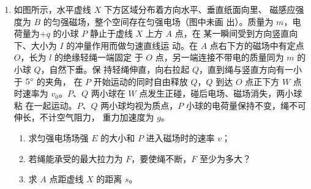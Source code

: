\begin{enumerate}
\item 
{}
如图所示，水平虚线 $ X $ 下方区域分布着方向水平、垂直纸面向里、
磁感应强度为 $ B $ 的匀强磁场，整个空间存在匀强电场（图中未画
出）。质量为 $ m $，电荷量为$ +q $ 的小球 $ P $ 静止于虚线 $ X $ 上方 $ A $ 点，在
某一瞬间受到方向竖直向下、大小为 $ I $ 的冲量作用而做匀速直线运
动。在 $ A $ 点右下方的磁场中有定点 $ O $，长为 $ l $ 的绝缘轻绳一端固定
于 $ O $ 点，另一端连接不带电的质量同为 $ m $ 的小球 $ Q $，自然下垂。保
持轻绳伸直，向右拉起 $ Q $，直到绳与竖直方向有一小于 $ 5 \degree  $ 的夹角，
在 $ P $ 开始运动的同时自由释放 $ Q $，$ Q $ 到达 $ O $ 点正下方 $ W $ 点时速率为
$ v_{0} $。$ P $、$ Q $ 两小球在 $ W $ 点发生正碰，碰后电场、磁场消失，两小球粘
在一起运动。$ P $、$ Q $ 两小球均视为质点，$ P $ 小球的电荷量保持不变，绳不可伸长，不计空气阻力，
重力加速度为 $ g $。
\begin{enumerate}
	\item
求匀强电场场强 $ E $ 的大小和 $ P $ 进入磁场时的速率 $ v $；

\item 
若绳能承受的最大拉力为 $ F $，要使绳不断，$ F $ 至少为多大？

\item 
求 $ A $ 点距虚线 $ X $ 的距离 $ s $。

\end{enumerate}
\begin{figure}[h!]
	\flushright
	
\end{figure}



\end{enumerate}

